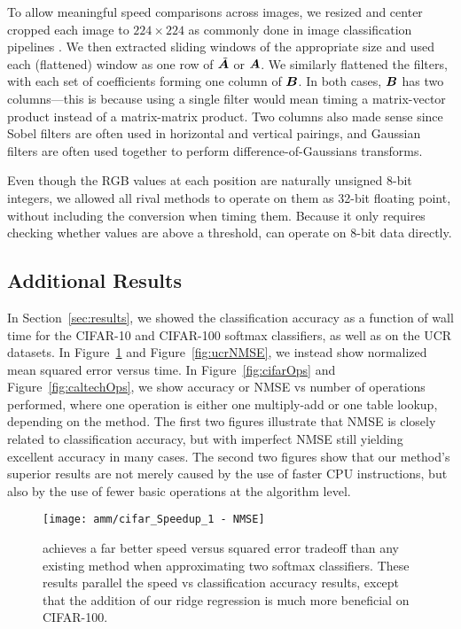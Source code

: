 To allow meaningful speed comparisons across images, we resized and center cropped each image to $224 \times 224$ as commonly done in image classification pipelines \cite{resNet,resnet2,densenet}. We then extracted sliding windows of the appropriate size and used each (flattened) window as one row of $\tilde{\bm{A}}$ or $\bm{A}$. We similarly flattened the filters, with each set of coefficients forming one column of $\bm{B}$. In both cases, $\bm{B}$ has two columns---this is because using a single filter would mean timing a matrix-vector product instead of a matrix-matrix product. Two columns also made sense since Sobel filters are often used in horizontal and vertical pairings, and Gaussian filters are often used together to perform difference-of-Gaussians transforms.

Even though the RGB values at each position are naturally unsigned 8-bit integers, we allowed all rival methods to operate on them as 32-bit floating point, without including the conversion when timing them. Because it only requires checking whether values are above a threshold, \oursp can operate on 8-bit data directly.

\subsection{Additional Results}

In Section~\ref{sec:results}, we showed the classification accuracy as a function of wall time for the CIFAR-10 and CIFAR-100 softmax classifiers, as well as on the UCR datasets. In Figure~\ref{fig:cifarNMSE} and Figure~\ref{fig:ucrNMSE}, we instead show normalized mean squared error versus time. In Figure~\ref{fig:cifarOps} and Figure~\ref{fig:caltechOps}, we show accuracy or NMSE vs number of operations performed, where one operation is either one multiply-add or one table lookup, depending on the method. The first two figures illustrate that NMSE is closely related to classification accuracy, but with imperfect NMSE still yielding excellent accuracy in many cases. The second two figures show that our method's superior results are not merely caused by the use of faster CPU instructions, but also by the use of fewer basic operations at the algorithm level.

\begin{figure}[h]
\begin{center}
\texttt{[image: amm/cifar\_Speedup\_1 - NMSE]}
\caption{\oursp achieves a far better speed versus squared error tradeoff than any existing method when approximating two softmax classifiers. These results parallel the speed vs classification accuracy results, except that the addition of our ridge regression is much more beneficial on CIFAR-100.}
\label{fig:cifarNMSE}
\end{center}
\end{figure}

